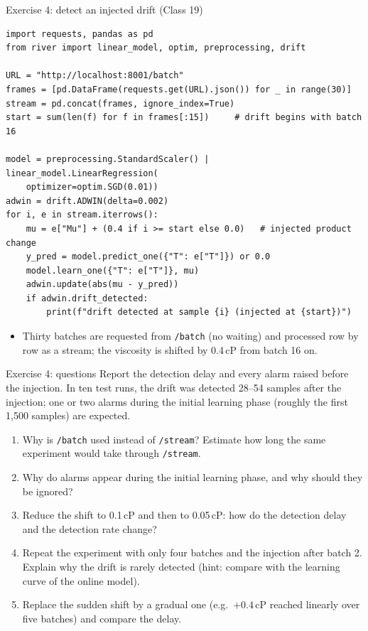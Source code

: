 \begin{frame}[fragile]{Exercise 4: detect an injected drift (Class 19)}
\begin{lstlisting}[style=coursepython, basicstyle=\ttfamily\scriptsize]
import requests, pandas as pd
from river import linear_model, optim, preprocessing, drift

URL = "http://localhost:8001/batch"
frames = [pd.DataFrame(requests.get(URL).json()) for _ in range(30)]
stream = pd.concat(frames, ignore_index=True)
start = sum(len(f) for f in frames[:15])     # drift begins with batch 16

model = preprocessing.StandardScaler() | linear_model.LinearRegression(
    optimizer=optim.SGD(0.01))
adwin = drift.ADWIN(delta=0.002)
for i, e in stream.iterrows():
    mu = e["Mu"] + (0.4 if i >= start else 0.0)   # injected product change
    y_pred = model.predict_one({"T": e["T"]}) or 0.0
    model.learn_one({"T": e["T"]}, mu)
    adwin.update(abs(mu - y_pred))
    if adwin.drift_detected:
        print(f"drift detected at sample {i} (injected at {start})")
\end{lstlisting}
\begin{itemize}\footnotesize
\item Thirty batches are requested from \texttt{/batch} (no waiting) and processed row by row as a stream; the viscosity is shifted by 0.4\,cP from batch 16 on.
\end{itemize}
\coursefooter
\end{frame}

\begin{frame}{Exercise 4: questions}
\begingroup\small
Report the detection delay and every alarm raised before the injection. In ten test runs, the drift was detected 28--54 samples after the injection; one or two alarms during the initial learning phase (roughly the first 1{,}500 samples) are expected.
\par\endgroup
\vspace{0.3em}
\begin{enumerate}\small
\item Why is \texttt{/batch} used instead of \texttt{/stream}? Estimate how long the same experiment would take through \texttt{/stream}.
\item Why do alarms appear during the initial learning phase, and why should they be ignored?
\item Reduce the shift to 0.1\,cP and then to 0.05\,cP: how do the detection delay and the detection rate change?
\item Repeat the experiment with only four batches and the injection after batch 2. Explain why the drift is rarely detected (hint: compare with the learning curve of the online model).
\item Replace the sudden shift by a gradual one (e.g.\ $+0.4\,$cP reached linearly over five batches) and compare the delay.
\end{enumerate}
\coursefooter
\end{frame}

